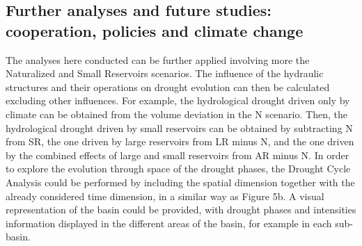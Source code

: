 \documentclass[draft]{agujournal2019}
\begin{document}
\subsection{Further analyses and future studies: cooperation, policies and climate change}
The analyses here conducted can be further applied involving more the Naturalized and Small Reservoirs scenarios. The influence of the hydraulic structures and their operations on drought evolution can then be calculated excluding other influences. For example, the hydrological drought driven only by climate can be obtained from the volume deviation in the N scenario. Then, the hydrological drought driven by small reservoirs can be obtained by subtracting N from SR, the one driven by large reservoirs from LR minus N, and the one driven by the combined effects of large and small reservoirs from AR minus N. In order to explore the evolution through space of the drought phases, the Drought Cycle Analysis could be performed by including the spatial dimension together with the already considered time dimension, in a similar way as Figure 5b. A visual representation of the basin could be provided, with drought phases and intensities information displayed in the different areas of the basin, for example in each sub-basin.\\
\end{document}
